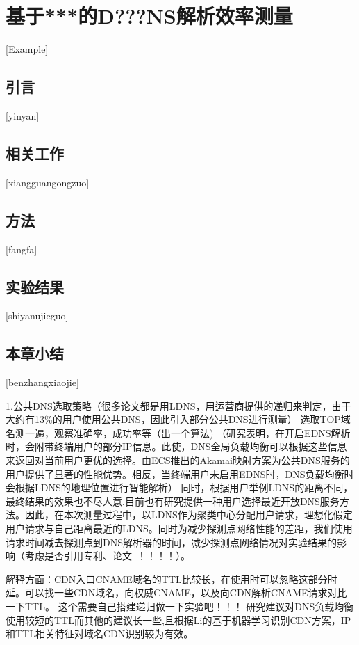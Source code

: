 
\chapter{基于***的D???NS解析效率测量}[Example]


\section{引言}[yinyan]
\section{相关工作}[xiangguangongzuo]

\section{方法}[fangfa]

\section{实验结果}[shiyanujieguo]
\section{本章小结}[benzhangxiaojie]


1.公共DNS选取策略（很多论文都是用LDNS，用运营商提供的递归来判定，由于大约有13\%的用户使用公共DNS\cite{Callejo-2019-Measuring}，因此引入部分公共DNS进行测量） 
选取TOP域名测一遍，观察准确率，成功率等（出一个算法)
（研究表明，在开启EDNS解析时，会附带终端用户的部分IP信息。此使，DNS全局负载均衡可以根据这些信息来返回对当前用户更优的选择。由ECS推出的Akamai映射方案为公共DNS服务的用户提供了显著的性能优势\cite{Chen2015}。相反，当终端用户未启用EDNS时，DNS负载均衡时会根据LDNS的地理位置进行智能解析\cite{Hao2018}）
同时，根据用户举例LDNS的距离不同，最终结果的效果也不尽人意\cite{pan-2003-dns},目前也有研究提供一种用户选择最近开放DNS服务\cite{Zhang-2021-Scale-platform}方法。因此，在本次测量过程中，以LDNS作为聚类中心分配用户请求，理想化假定用户请求与自己距离最近的LDNS。同时为减少探测点网络性能的差距，我们使用请求时间减去探测点到DNS解析器的时间，减少探测点网络情况对实验结果的影响（考虑是否引用专利、论文~！！！！）。
 
解释方面：CDN入口CNAME域名的TTL比较长，在使用时可以忽略这部分时延。可以找一些CDN域名，向权威CNAME，以及向CDN解析CNAME请求对比一下TTL。
这个需要自己搭建递归做一下实验吧！！！ 研究\cite{Moura2019}建议对DNS负载均衡使用较短的TTL而其他的建议长一些,且根据Li\cite{Li2020}的基于机器学习识别CDN方案，IP和TTL相关特征对域名CDN识别较为有效。   

